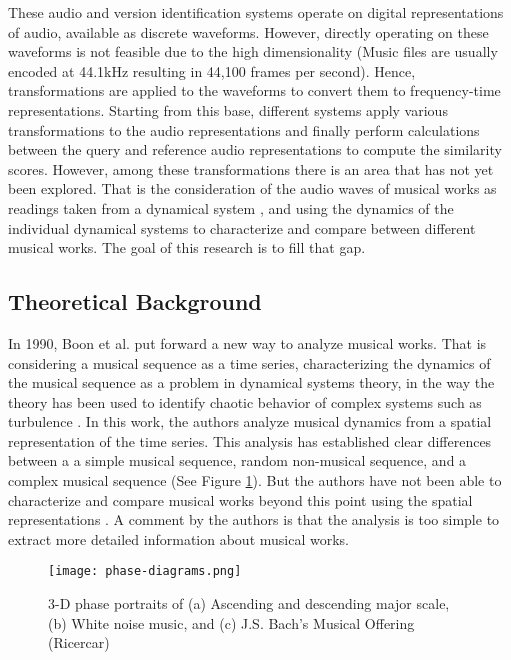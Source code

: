 \documentclass[../main.tex]{subfiles}
\begin{document}
\par
These audio and version identification systems operate on digital representations of audio, available as discrete waveforms. However, directly operating on these waveforms is not feasible due to the high dimensionality (Music files are usually encoded at 44.1kHz resulting in 44,100 frames per second). Hence, transformations are applied to the waveforms to convert them to frequency-time representations. Starting from this base, different systems apply various transformations to the audio representations  and finally perform calculations between the query and reference audio representations to compute the similarity scores. However, among these transformations there is an area that has not yet been explored. That is the consideration of the audio waves of musical works as readings taken from a dynamical system \cite{complex_dynamics}, and using the dynamics of the individual dynamical systems to characterize and compare between different musical works. The goal of this research is to fill that gap.




\subsection{Theoretical Background}

\par
In 1990, Boon et al. put forward a new way to analyze musical works. That is considering a musical sequence as a time series, characterizing the dynamics of the musical sequence as a problem in dynamical systems theory, in the way the theory has been used to identify chaotic behavior of complex systems such as turbulence \cite{complex_dynamics}. In this work, the authors analyze musical dynamics from a spatial representation of the time series. This analysis has established clear differences between a a simple musical sequence, random non-musical sequence, and a complex musical sequence (See Figure \ref{fig:phase-diagrams}). But the authors have not been able to characterize and compare musical works beyond this point using the spatial representations \cite{boonDynamicalSystemsTheory1995}. A comment by the authors is that the analysis is too simple to extract more detailed information about musical works.

\begin{figure}[h]
    \centering
    \texttt{[image: phase-diagrams.png]}
    \caption{3-D phase portraits of (a) Ascending and descending major scale, (b) White noise music, and (c) J.S. Bach's Musical Offering (Ricercar)}
    \label{fig:phase-diagrams}
\end{figure}
\end{document}
